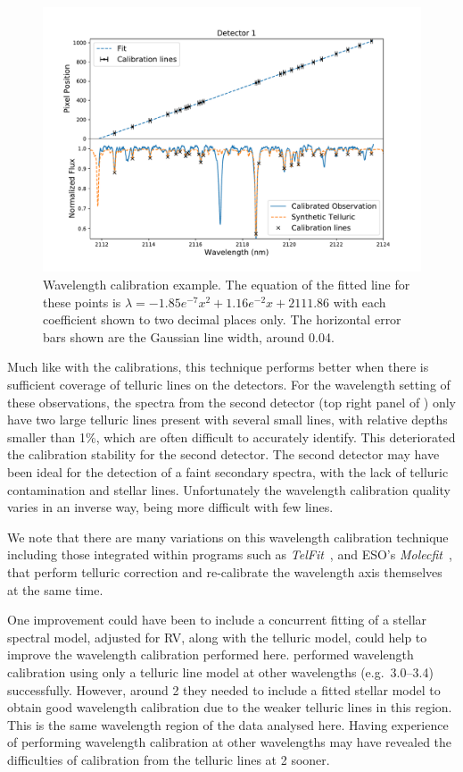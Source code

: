 \begin{figure}
    \centering
    \includegraphics[width=0.8\linewidth]{figures/reduction/calibration.pdf}
    \caption{Wavelength calibration example.
    The equation of the fitted line for these points is $\lambda = -1.85e^{-7} x^2 + 1.16e^{-2} x + 2111.86$ with each coefficient shown to two decimal places only. The horizontal error bars shown are the Gaussian line width, around 0.04\nm{}.}
    \label{fig:wl_calibration}
\end{figure}

Much like with the \thar{} calibrations, this technique performs better when there is sufficient coverage of telluric lines on the detectors. For the wavelength setting of these observations, the spectra from the second detector (top right panel of ) only have two large telluric lines present with several small lines, with relative depths smaller than 1\%, which are often difficult to accurately identify. This deteriorated the calibration stability for the second detector. The second detector may have been ideal for the detection of a faint secondary spectra, with the lack of telluric contamination and stellar lines. Unfortunately the wavelength calibration quality varies in an inverse way, being more difficult with few lines.

We note that there are many variations on this wavelength calibration technique including those integrated within programs such as \emph{TelFit}~\citet{gullikson_correcting_2014}, and {ESO}'s \emph{Molecfit}~\citet{smette_molecfit_2015}, that perform telluric correction and re-calibrate the wavelength axis themselves at the same time.

One improvement could have been to include a concurrent fitting of a stellar spectral model, adjusted for {RV}, along with the telluric model, could help to improve the wavelength calibration performed here. \citet{piskorz_evidence_2016} performed wavelength calibration using only a telluric line model at other \nir{} wavelengths {\red{} (e.g.\ 3.0--3.4\um{})} successfully. However, around 2\um{} they needed to include a fitted stellar model to obtain good wavelength calibration due to the weaker telluric lines in this region. This is the same wavelength region of the data analysed here. Having experience of performing wavelength calibration at other wavelengths may have revealed the difficulties of calibration from the telluric lines at 2\um{} sooner.

